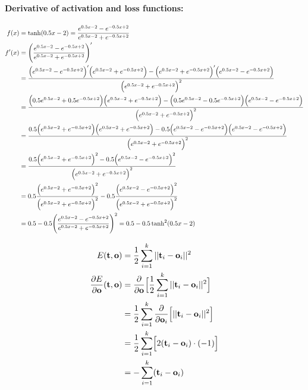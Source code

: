 \documentclass[12pt]{article}
\begin{document}
\begin{enumerate}[leftmargin=\labelsep]
    \paragraph{Derivative of activation and loss functions:}
    \begin{equation}
    \begin{split}
        f(x) &= \tanh(0.5x-2) = \frac{e^{0.5x-2}-e^{-0.5x+2}}{e^{0.5x-2}+e^{-0.5x+2}} \\
        f'(x) &= \Biggl(\frac{e^{0.5x-2}-e^{-0.5x+2}}{e^{0.5x-2}+e^{-0.5x+2}} \Biggr)' \\
        &= \frac{\Bigl(e^{0.5x-2}-e^{-0.5x+2}\Bigr)'\Bigl(e^{0.5x-2}+e^{-0.5x+2}\Bigr)-\Bigl(e^{0.5x-2}+e^{-0.5x+2}\Bigr)'\Bigl(e^{0.5x-2}-e^{-0.5x+2}\Bigr)}{\Bigl(e^{0.5x-2}+e^{-0.5x+2}\Bigr)^2} \\
        &= \frac{\Bigl(0.5e^{0.5x-2}+0.5e^{-0.5x+2}\Bigr)\Bigl(e^{0.5x-2}+e^{-0.5x+2}\Bigr)-\Bigl(0.5e^{0.5x-2}-0.5e^{-0.5x+2}\Bigr)\Bigl(e^{0.5x-2}-e^{-0.5x+2}\Bigr)}{\Bigl(e^{0.5x-2}+e^{-0.5x+2}\Bigr)^2} \\
        &= \frac{0.5\Bigl(e^{0.5x-2}+e^{-0.5x+2}\Bigr)\Bigl(e^{0.5x-2}+e^{-0.5x+2}\Bigr)-0.5\Bigl(e^{0.5x-2}-e^{-0.5x+2}\Bigr)\Bigl(e^{0.5x-2}-e^{-0.5x+2}\Bigr)}{\Bigl(e^{0.5x-2}+e^{-0.5x+2}\Bigr)^2} \\
        &= \frac{0.5\Bigl(e^{0.5x-2}+e^{-0.5x+2}\Bigr)^2-0.5\Bigl(e^{0.5x-2}-e^{-0.5x+2}\Bigr)^2}{\Bigl(e^{0.5x-2}+e^{-0.5x+2}\Bigr)^2} \\
        &= 0.5\frac{\Bigl(e^{0.5x-2}+e^{-0.5x+2}\Bigr)^2}{\Bigl(e^{0.5x-2}+e^{-0.5x+2}\Bigr)^2} - 0.5\frac{\Bigl(e^{0.5x-2}-e^{-0.5x+2}\Bigr)^2}{\Bigl(e^{0.5x-2}+e^{-0.5x+2}\Bigr)^2}\\
        &= 0.5 - 0.5\Biggl(\frac{e^{0.5x-2}-e^{-0.5x+2}}{e^{0.5x-2}+e^{-0.5x+2}}\Biggr)^2 = 0.5 - 0.5\tanh^2(0.5x-2)
    \end{split}
    \end{equation}

    \begin{equation}
    \begin{split}
        E(\mathbf{t}, \mathbf{o}) &= \frac{1}{2}\sum_{i=1}^{k}||\mathbf{t}_i-\mathbf{o}_i||^2 \\
        \frac{\partial E}{\partial \mathbf{o}}(\mathbf{t}, \mathbf{o}) &= \frac{\partial}{\partial \mathbf{o}}\Bigl[\frac{1}{2}\sum_{i=1}^{k}||\mathbf{t}_i-\mathbf{o}_i||^2 \Bigr] \\
        &= \frac{1}{2}\sum_{i=1}^{k}\frac{\partial}{\partial \mathbf{o}_i}\Bigl[||\mathbf{t}_i-\mathbf{o}_i||^2 \Bigr] \\
        &= \frac{1}{2}\sum_{i=1}^{k}\Bigl[ 2(\mathbf{t}_i - \mathbf{o}_i)\cdot(-1)\Bigr] \\
        &= -\sum_{i=1}^{k}(\mathbf{t}_i - \mathbf{o}_i)
    \end{split}
    \end{equation}


\end{enumerate}
\end{document}
